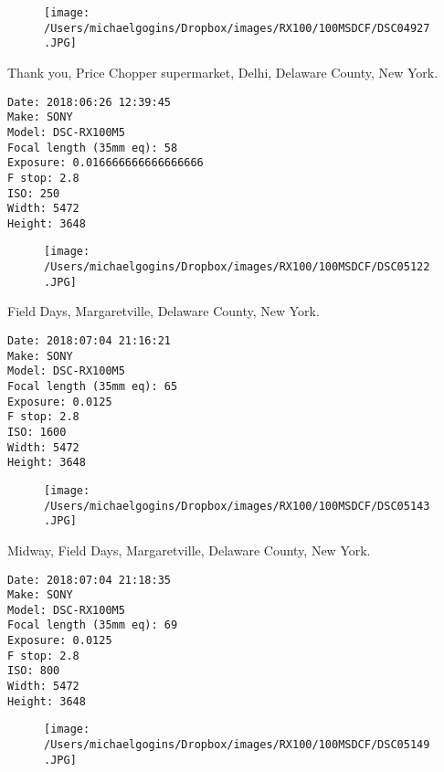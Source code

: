 \documentclass[11pt,letter,DIV=14,paper=landscape]{scrbook}
\begin{document}
\begin{figure}
\texttt{[image: /Users/michaelgogins/Dropbox/images/RX100/100MSDCF/DSC04927.JPG]}
\end{figure}
    
\clearpage
\noindent Thank you, Price Chopper supermarket, Delhi, Delaware County, New York.
\noindent
\begin{lstlisting}
Date: 2018:06:26 12:39:45
Make: SONY
Model: DSC-RX100M5
Focal length (35mm eq): 58
Exposure: 0.016666666666666666
F stop: 2.8
ISO: 250
Width: 5472
Height: 3648
\end{lstlisting}
\clearpage

\begin{figure}
\texttt{[image: /Users/michaelgogins/Dropbox/images/RX100/100MSDCF/DSC05122.JPG]}
\end{figure}
    
\clearpage
\noindent Field Days, Margaretville, Delaware County, New York.
\noindent
\begin{lstlisting}
Date: 2018:07:04 21:16:21
Make: SONY
Model: DSC-RX100M5
Focal length (35mm eq): 65
Exposure: 0.0125
F stop: 2.8
ISO: 1600
Width: 5472
Height: 3648
\end{lstlisting}
\clearpage

\begin{figure}
\texttt{[image: /Users/michaelgogins/Dropbox/images/RX100/100MSDCF/DSC05143.JPG]}
\end{figure}
    
\clearpage
\noindent Midway, Field Days, Margaretville, Delaware County, New York.
\noindent
\begin{lstlisting}
Date: 2018:07:04 21:18:35
Make: SONY
Model: DSC-RX100M5
Focal length (35mm eq): 69
Exposure: 0.0125
F stop: 2.8
ISO: 800
Width: 5472
Height: 3648
\end{lstlisting}
\clearpage

\begin{figure}
\texttt{[image: /Users/michaelgogins/Dropbox/images/RX100/100MSDCF/DSC05149.JPG]}
\end{figure}
    
\end{document}
